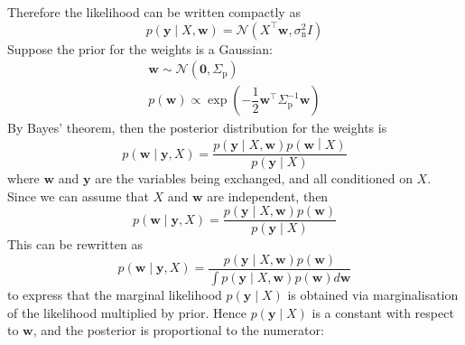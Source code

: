 \documentclass[11pt]{report} %
\begin{document}
Therefore the likelihood can be written compactly as
\begin{equation}
p\left(\mathbf{y}\middle|X,\mathbf{w}\right)=\mathcal{N}\left(X^{\top}\mathbf{w},\sigma_{\mathrm{n}}^{2}I\right)
\end{equation}
Suppose the prior for the weights is a Gaussian:
\begin{gather}
\mathbf{w}\sim\mathcal{N}\left(\mathbf{0},\Sigma_{\mathrm{p}}\right) \\
p\left(\mathbf{w}\right)\propto\exp\left(-\dfrac{1}{2}\mathbf{w}^{\top}\Sigma_{\mathrm{p}}^{-1}\mathbf{w}\right)
\end{gather}
By Bayes' theorem, then the posterior distribution for the weights is
\begin{equation}
p\left(\mathbf{w}\middle|\mathbf{y},X\right)=\dfrac{p\left(\mathbf{y}\middle|X,\mathbf{w}\right)p\left(\mathbf{w}\middle|X\right)}{p\left(\mathbf{y}\middle|X\right)}
\end{equation}
where $\mathbf{w}$ and $\mathbf{y}$ are the variables being exchanged, and all conditioned on $X$. Since we can assume that $X$ and $\mathbf{w}$ are independent, then
\begin{equation}
p\left(\mathbf{w}\middle|\mathbf{y},X\right)=\dfrac{p\left(\mathbf{y}\middle|X,\mathbf{w}\right)p\left(\mathbf{w}\right)}{p\left(\mathbf{y}\middle|X\right)}
\end{equation}
This can be rewritten as
\begin{equation}
p\left(\mathbf{w}\middle|\mathbf{y},X\right)=\dfrac{p\left(\mathbf{y}\middle|X,\mathbf{w}\right)p\left(\mathbf{w}\right)}{\int p\left(\mathbf{y}\middle|X,\mathbf{w}\right)p\left(\mathbf{w}\right)d\mathbf{w}}
\end{equation}
to express that the marginal likelihood $p\left(\mathbf{y}\middle|X\right)$ is obtained via marginalisation of the likelihood multiplied by prior. Hence $p\left(\mathbf{y}\middle|X\right)$ is a constant with respect to $\mathbf{w}$, and the posterior is proportional to the numerator:
\end{document}
